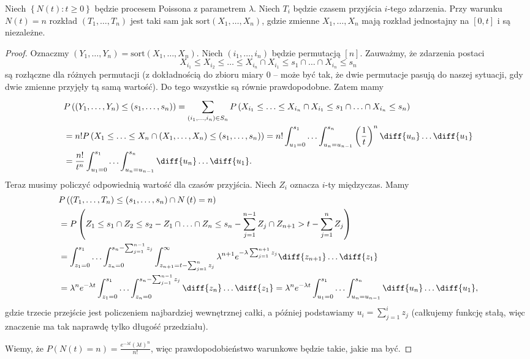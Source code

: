 \begin{theorem}
    Niech $\left\{ N\left( t  \right) : t\ge 0 \right\} $ będzie procesem Poissona z parametrem $\lambda$. Niech $T_i$ będzie czasem przyjścia $i$-tego zdarzenia. Przy warunku $N\left( t  \right) = n $ rozkład $\left( T_1,\ldots,T_n \right) $ jest taki sam jak $\mathrm{sort}\left( X_1,\ldots,X_n \right) $, gdzie zmienne $X_1,\ldots,X_n$ mają rozkład jednostajny na $[0,t]$ i są niezależne.
\end{theorem}
\begin{proof}
    Oznaczmy $\left( Y_1,\ldots,Y_n \right) = \mathrm{sort}\left( X_1,\ldots,X_n \right) $. Niech $\left( i_1,\ldots,i_n \right) $ będzie permutacją $[n]$. Zauważmy, że zdarzenia postaci
        $$ X_{i_1} \le X_{i_2} \le \ldots \le X_{i_n} \cap X_{i_1} \le s_1 \cap \ldots \cap X_{i_n}\le s_n $$
        są rozłączne dla różnych permutacji (z dokładnością do zbioru miary $0$ -- może być tak, że dwie permutacje pasują do naszej sytuacji, gdy dwie zmienne przyjęły tą samą wartość). Do tego wszystkie są równie prawdopodobne. Zatem mamy
    \begin{align*}
        &P\left( \left( Y_1,\ldots,Y_n \right) \le \left( s_1,\ldots,s_n \right)  \right)  = \sum_{\left( i_1,\ldots,i_n \right) \in S_n}^{} P\left( X_{i_1}\le \ldots\le X_{i_n} \cap X_{i_1} \le s_1 \cap \ldots \cap X_{i_n}\le s_n \right) \\
        &= n! P\left( X_1\le \ldots\le X_n \cap \left( X_1,\ldots,X_n \right) \le \left( s_1,\ldots,s_n \right)  \right) = n!\int_{u_1=0}^{s_1} \ldots \int_{u_n=u_{n-1}}^{s_n} \left( \frac{1}{t} \right) ^{n} \diff{u_n} \ldots \diff{u_{1}} \\ 
        &= \frac{n!}{t ^{n}} \int_{u_1=0}^{s_1} \ldots \int_{u_n=u_{n-1}}^{s_n} \diff{u_n} \ldots\diff{u_1} .
    \end{align*}
    Teraz musimy policzyć odpowiednią wartość dla czasów przyjścia. Niech $Z_i$ oznacza $i$-ty międzyczas. Mamy
    \begin{align*}
        &P\left( \left( T_1,\ldots,T_n \right) \le \left( s_1,\ldots,s_n \right) \cap  N\left( t  \right) = n \right) \\ 
        &= P\left( Z_1\le s_1 \cap Z_2\le s_2-Z_1 \cap \ldots\cap Z_n \le s_n - \sum_{j=1}^{n-1} Z_j \cap Z_{n+1} > t- \sum_{j=1}^{n} Z_j \right) \\ 
        &= \int_{z_1=0}^{s_1} \ldots \int_{z_n=0}^{s_n - \sum_{j=1}^{n-1} z_j} \int_{z_{n+1}= t - \sum_{j=1}^{n} z_j}^{\infty} \lambda^{n+1}e^{-\lambda \sum_{j=1}^{n+1} z_j} \diff{z_{n+1}} \ldots\diff{z_1}   \\ 
        &= \lambda^{n} e^{-\lambda t } \int_{z_1=0}^{s_1} \ldots \int_{z_n=0}^{s_n - \sum_{j=1}^{n-1} z_j} \diff{z_n} \ldots \diff{z_1} = \lambda^{n}e^{-\lambda t } \int_{u_1=0}^{s_1} \ldots \int_{u_n = u_{n-1}}^{s_n} \diff{u_n} \ldots\diff{u_1} ,
    \end{align*}
    gdzie trzecie przejście jest policzeniem najbardziej wewnętrznej całki, a później podstawiamy $u_i = \sum_{j=1}^{i} z_j$ (całkujemy funkcję stałą, więc znaczenie ma tak naprawdę tylko długość przedziału).

    Wiemy, że $P\left( N\left( t  \right) = n  \right) = \frac{e^{-\lambda t }\left( \lambda t  \right) ^{n}}{n!}$, więc prawdopodobieństwo warunkowe będzie takie, jakie ma być.
\end{proof}

